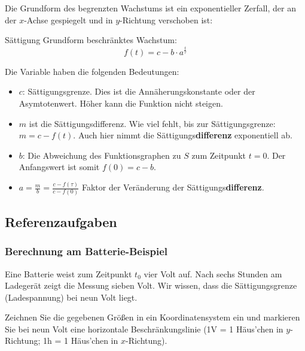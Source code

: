 \begin{center}
\end{center}

Die Grundform des begrenzten Wachstums ist ein exponentieller Zerfall,
der an der $x$-Achse gespiegelt und in $y$-Richtung
verschoben ist:

\begin{gesetz}{Sättigung}{}
  Grundform beschränktes Wachstum:
$$f(t) =c - b\cdot{} a^{\frac{t}{\tau}}$$
\end{gesetz}

Die Variable haben die folgenden Bedeutungen:

\begin{itemize}
	\item $c$: Sättigungsgrenze. Dies ist die Annäherungskonstante oder der Asymtotenwert. Höher kann die Funktion nicht steigen.

	\item $m$ ist die
    Sättigungsdifferenz. Wie viel fehlt, bis zur
    Sättigungsgrenze: $m = c - f(t)$. Auch hier nimmt die Sättigungs\textbf{differenz} exponentiell ab.
	\item $b$: Die Abweichung des Funktionsgraphen zu $S$ zum Zeitpunkt $t=0$. Der
    Anfangswert ist somit $f(0) = c - b$.
\item $a=\frac{m}{b}=\frac{c-f(\tau)}{c-f(0)}$ Faktor der Veränderung
  der Sättigungs\textbf{differenz}.
\end{itemize}


\newpage

\subsection{Referenzaufgaben}

\subsubsection{Berechnung am Batterie-Beispiel}
Eine Batterie weist zum Zeitpunkt $t_0$ vier Volt auf. Nach sechs Stunden am Ladegerät zeigt die Messung sieben Volt. Wir wissen, dass die Sättigungsgrenze (Ladespannung) bei neun Volt liegt.

Zeichnen Sie die gegebenen Größen in ein Koordinatensystem ein und markieren Sie bei neun Volt eine horizontale Beschränkungslinie (\zB 1V = 1 Häus'chen in $y$-Richtung; 1h = 1 Häus'chen in $x$-Richtung).

